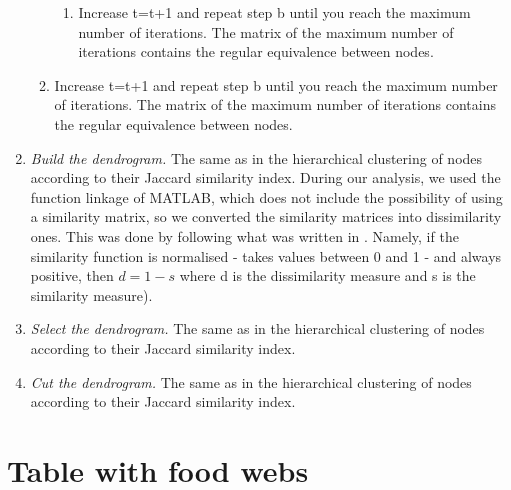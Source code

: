 \documentclass[twocolumn]{article}
\begin{document}
\begin{appendices}
\begin{enumerate}
\begin{enumerate}
\begin{enumerate}
						            \item Increase t=t+1 and repeat step b until you reach the maximum number of iterations. The matrix of the maximum number of iterations contains the regular equivalence between nodes.
					            \end{enumerate}
					      \item Increase t=t+1 and repeat step b until you reach the maximum number of iterations. The matrix of the maximum number of iterations contains the regular equivalence between nodes.
				      \end{enumerate}
				\item \emph{Build the dendrogram.} \smallskip \newline
							The same as in the hierarchical clustering of nodes according to their Jaccard similarity index. During our analysis, we used the function linkage of MATLAB, which does not include the possibility of using a similarity matrix, so we converted the similarity matrices into dissimilarity ones. This was done by following what was written in \citet{VonLuxburg2004}. Namely, if the similarity function is normalised - takes values between 0 and 1 - and always positive, then $d=1-s$ where d is the dissimilarity measure and s is the similarity measure).
				\item \emph{Select the dendrogram.} \smallskip \newline
							The same as in the hierarchical clustering of nodes according to their Jaccard similarity index.
				\item \emph{Cut the dendrogram.} \smallskip \newline
				      The same as in the hierarchical clustering of nodes according to their Jaccard similarity index.
		\end{enumerate}
	\section{Table with food webs}
	\label{appendix:c}
\end{appendices}
\end{document}
